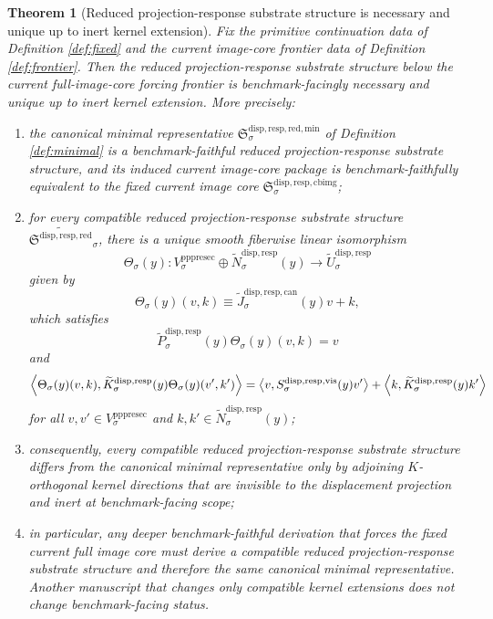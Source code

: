 \documentclass[11pt]{article}
\newcommand{\PrePreProtoSectionVertical}[1]{V_{#1}^{\mathrm{pppresec}}}
\newcommand{\ReducedStructure}{\mathfrak S^{\mathrm{disp,resp,red}}}
\newcommand{\CurrentBodyImageCore}{\mathfrak S^{\mathrm{disp,resp,cbimg}}}
\newcommand{\VisibleResponseOperator}[1]{S_{#1}^{\mathrm{disp,resp,vis}}}
\newcommand{\CompatibleCarrier}[1]{\widetilde U_{#1}^{\mathrm{disp,resp}}}
\newcommand{\CompatibleProjection}[1]{\widetilde P_{#1}^{\mathrm{disp,resp}}}
\newcommand{\CompatibleOperator}[1]{\widetilde K_{#1}^{\mathrm{disp,resp}}}
\newcommand{\CompatibleKernel}[1]{\widetilde N_{#1}^{\mathrm{disp,resp}}}
\newcommand{\CompatibleLift}[1]{\widetilde J_{#1}^{\mathrm{disp,resp,can}}}
\newcommand{\MinimalReducedStructure}{\mathfrak S^{\mathrm{disp,resp,red,min}}}
\newtheorem{theorem}{Theorem}
\begin{document}
\begin{theorem}[Reduced projection-response substrate structure is necessary and unique up to inert kernel extension]
\label{thm:main}
Fix the primitive continuation data of Definition \ref{def:fixed} and the current image-core frontier data of Definition \ref{def:frontier}. Then the reduced projection-response substrate structure below the current full-image-core forcing frontier is benchmark-facingly necessary and unique up to inert kernel extension. More precisely:
\begin{enumerate}
    \item the canonical minimal representative \(\MinimalReducedStructure_{\sigma}\) of Definition \ref{def:minimal} is a benchmark-faithful reduced projection-response substrate structure, and its induced current image-core package is benchmark-faithfully equivalent to the fixed current image core \(\CurrentBodyImageCore_{\sigma}\);
    \item for every compatible reduced projection-response substrate structure \(\widetilde{\ReducedStructure}_{\sigma}\), there is a unique smooth fiberwise linear isomorphism
    \[
    \Theta_{\sigma}(y):
    \PrePreProtoSectionVertical{\sigma}\oplus\CompatibleKernel{\sigma}(y)
    \longrightarrow
    \CompatibleCarrier{\sigma}
    \]
    given by
    \[
    \Theta_{\sigma}(y)(v,k)
    \equiv
    \CompatibleLift{\sigma}(y)v+k,
    \]
    which satisfies
    \begin{equation}
    \CompatibleProjection{\sigma}(y)\Theta_{\sigma}(y)(v,k)=v
    \label{eq:theta_proj}
    \end{equation}
    and
    \begin{equation}
    \ev{
    \Theta_{\sigma}(y)(v,k),
    \CompatibleOperator{\sigma}(y)\Theta_{\sigma}(y)(v',k')
    }
    =
    \ev{v,\VisibleResponseOperator{\sigma}(y)v'}
    +
    \ev{k,\CompatibleOperator{\sigma}(y)k'}
    \label{eq:theta_energy}
    \end{equation}
    for all \(v,v'\in\PrePreProtoSectionVertical{\sigma}\) and \(k,k'\in\CompatibleKernel{\sigma}(y)\);
    \item consequently, every compatible reduced projection-response substrate structure differs from the canonical minimal representative only by adjoining \(K\)-orthogonal kernel directions that are invisible to the displacement projection and inert at benchmark-facing scope;
    \item in particular, any deeper benchmark-faithful derivation that forces the fixed current full image core must derive a compatible reduced projection-response substrate structure and therefore the same canonical minimal representative. Another manuscript that changes only compatible kernel extensions does not change benchmark-facing status.
\end{enumerate}
\end{theorem}
\end{document}
